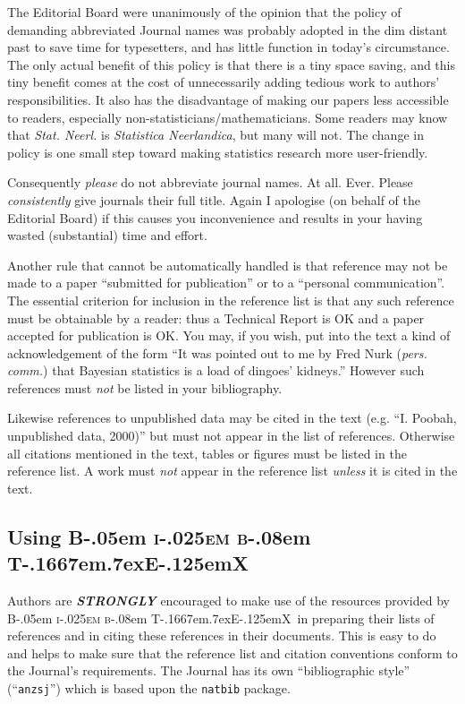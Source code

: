 \documentclass[times, doublespace]{anzsauth}
\newcommand\BibTeX{{\rmfamily B\kern-.05em \textsc{i\kern-.025em b}\kern-.08em
T\kern-.1667em\lower.7ex\hbox{E}\kern-.125emX}}
\begin{document}
The Editorial Board were unanimously of the opinion that
the policy of demanding abbreviated Journal names was probably
adopted in the dim distant past to save time for typesetters,
and has little function in today's circumstance.  The only actual
benefit of this policy is that there is a tiny space saving,
and this tiny benefit comes at the cost of unnecessarily adding
tedious work to authors' responsibilities.  It also has the
disadvantage of making our papers less accessible to readers,
especially non-statisticians/mathematicians. Some readers may know
that \textit{Stat. Neerl.} is \textit{Statistica Neerlandica},
but many will not.  The change in policy is one small step toward
making statistics research more user-friendly.

Consequently \emph{please} do not abbreviate journal names.  At all.
Ever.  Please \emph{consistently} give journals their full title.
Again I apologise (on behalf of the Editorial Board) if this causes
you inconvenience and results in your having wasted (substantial)
time and effort.

Another rule that cannot be automatically handled is that reference
may not be made to a paper ``submitted for publication'' or to a
``personal communication''. The essential criterion for inclusion
in the reference list is that any such reference must be obtainable
by a reader: thus a Technical Report is OK and a paper accepted for
publication is OK.  You may, if you wish, put into the text a kind
of acknowledgement of the form ``It was pointed out to me by Fred
Nurk (\textit{pers. comm.}) that Bayesian statistics is a load
of dingoes' kidneys.''  However such references must \emph{not}
be listed in your bibliography.

Likewise references to unpublished data may be cited in the text
(e.g. ``I. Poobah, unpublished data, 2000)'' but must not appear in
the list of references.  Otherwise all citations mentioned in the
text, tables or figures must be listed in the reference list. A
work must \emph{not} appear in the reference list \emph{unless}
it is cited in the text.

\subsection{Using \BibTeX}
\label{sec:useBib}

Authors are \textbf{\textit{STRONGLY}} encouraged to make use of
the resources provided by \BibTeX\ in preparing their lists of references
and in citing these references in their documents.  This is easy
to do and helps to make sure that the reference list and citation
conventions conform to the Journal's requirements.  The Journal
has its own ``bibliographic style'' (``\texttt{anzsj}'') which is
based upon the \texttt{natbib} package.
\end{document}
